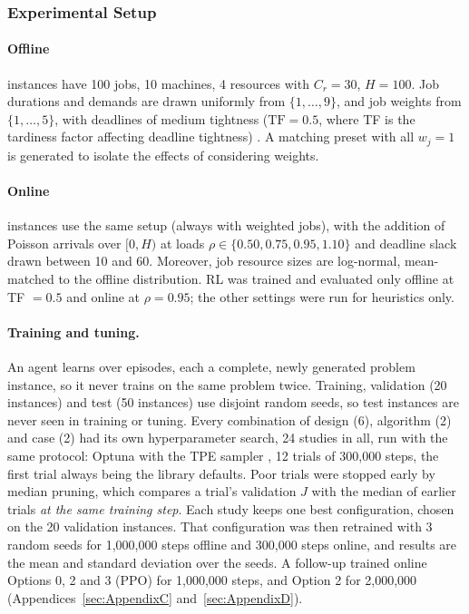 \documentclass[12pt]{article}
\begin{document}
\subsubsection{Experimental Setup}\label{sec:setup}
\paragraph{Offline} instances have 100 jobs, 10 machines, 4 resources with $C_r = 30$, $H = 100$. Job durations and demands are drawn uniformly from $\{1, \dots, 9\}$, and job weights from $\{1, \dots, 5\}$, with deadlines of medium tightness ($\mathrm{TF} = 0.5$, where TF is the tardiness factor affecting deadline tightness) \cite{potts1985wtardiness}. A matching preset with all $w_j = 1$ is generated to isolate the effects of considering weights.

\paragraph{Online} instances use the same setup (always with weighted jobs), with the addition of Poisson arrivals over $[0, H)$ at loads $\rho \in \{0.50, 0.75, 0.95, 1.10\}$ and deadline slack drawn between 10 and 60. Moreover, job resource sizes are log-normal, mean-matched to the offline distribution. RL was trained and evaluated only offline at TF $= 0.5$ and online at $\rho = 0.95$; the other settings were run for heuristics only.

\paragraph{Training and tuning.} An agent learns over episodes, each a complete, newly generated problem instance, so it never trains on the same problem twice. Training, validation (20 instances) and test (50 instances) use disjoint random seeds, so test instances are never seen in training or tuning. Every combination of design (6), algorithm (2) and case (2) had its own hyperparameter search, 24 studies in all, run with the same protocol: Optuna \cite{akiba2019optuna} with the TPE sampler \cite{bergstra2011tpe}, 12 trials of 300,000 steps, the first trial always being the library defaults. Poor trials were stopped early by median pruning, which compares a trial's validation $J$ with the median of earlier trials \emph{at the same training step}. Each study keeps one best configuration, chosen on the 20 validation instances. That configuration was then retrained with 3 random seeds for 1,000,000 steps offline and 300,000 steps online, and results are the mean and standard deviation over the seeds. A follow-up trained online Options 0, 2 and 3 (PPO) for 1,000,000 steps, and Option 2 for 2,000,000 (Appendices~\ref{sec:AppendixC} and~\ref{sec:AppendixD}).
\end{document}
